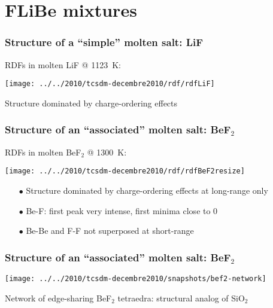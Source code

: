 \documentclass{beamer}
\begin{document}

\section{FLiBe mixtures}
\begin{frame}
   \frametitle{Structure of a ``simple'' molten salt: LiF}
RDFs in molten LiF @ 1123~K:
   \begin{center}
   \texttt{[image: ../../2010/tcsdm-decembre2010/rdf/rdfLiF]}
   \end{center}
Structure dominated by charge-ordering effects
\end{frame}

\begin{frame}
   \frametitle{Structure of an ``associated'' molten salt: BeF$_2$}
RDFs in molten BeF$_2$ @ 1300~K:
   \begin{center}
   \texttt{[image: ../../2010/tcsdm-decembre2010/rdf/rdfBeF2resize]}
   \end{center}
\begin{itemize}
\item[$\bullet$] Structure dominated by charge-ordering effects at long-range only 

\item[$\bullet$] Be-F: first peak very intense, first minima close to 0 
\item[$\bullet$] Be-Be and F-F not superposed at short-range
\end{itemize}

\end{frame}

\begin{frame}
   \frametitle{Structure of an ``associated'' molten salt: BeF$_2$}
   \begin{center}
   \texttt{[image: ../../2010/tcsdm-decembre2010/snapshots/bef2-network]}
   \end{center}
   Network of edge-sharing BeF$_2$ tetraedra: structural analog of SiO$_2$
\end{frame}
\end{document}
